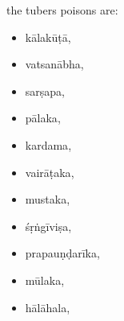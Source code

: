 \begin{translation}

        \item
        the tubers poisons are:
        \begin{itemize}
             \item \gls{kālakūṭā},
\item \gls{vatsanābha},
\item \gls{sarṣapa},
\item \gls{pālaka},
\item \gls{kardama},
\item \gls{vairāṭaka},
\item \gls{mustaka},
\item \gls{śṛṅgīviṣa},
\item \gls{prapauṇḍarīka},
\item \gls{mūlaka},
\item \gls{hālāhala},

\end{itemize}
\end{translation}
